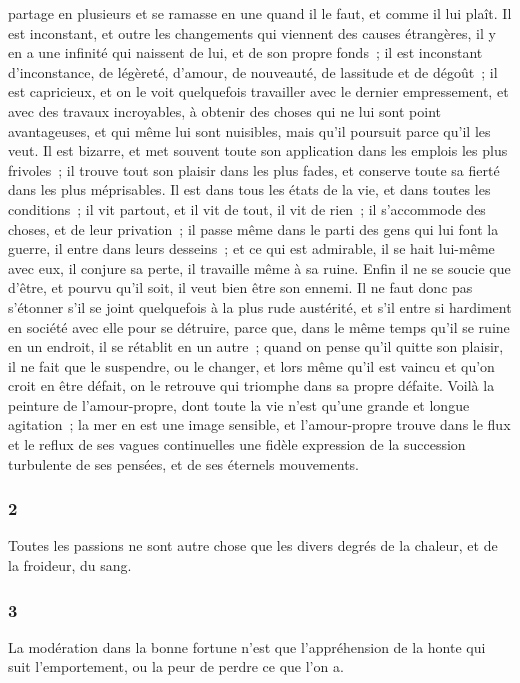 \documentclass[french,twoside]{book} %
\begin{document}
partage en plusieurs et se ramasse en une quand il le faut, et comme il lui plaît. Il est inconstant, et outre les changements qui viennent des causes étrangères, il y en a une infinité qui naissent de lui, et de son propre fonds ; il est inconstant d’inconstance, de légèreté, d’amour, de nouveauté, de lassitude et de dégoût ; il est capricieux, et on le voit quelquefois travailler avec le dernier empressement, et avec des travaux incroyables, à obtenir des choses qui ne lui sont point avantageuses, et qui même lui sont nuisibles, mais qu’il poursuit parce qu’il les veut. Il est bizarre, et met souvent toute son application dans les emplois les plus frivoles ; il trouve tout son plaisir dans les plus fades, et conserve toute sa fierté dans les plus méprisables. Il est dans tous les états de la vie, et dans toutes les conditions ; il vit partout, et il vit de tout, il vit de rien ; il s’accommode des choses, et de leur privation ; il passe même dans le parti des gens qui lui font la guerre, il entre dans leurs desseins ; et ce qui est admirable, il se hait lui-même avec eux, il conjure sa perte, il travaille même à sa ruine. Enfin il ne se soucie que d’être, et pourvu qu’il soit, il veut bien être son ennemi. Il ne faut donc pas s’étonner s’il se joint quelquefois à la plus rude austérité, et s’il entre si hardiment en société avec elle pour se détruire, parce que, dans le même temps qu’il se ruine en un endroit, il se rétablit en un autre ; quand on pense qu’il quitte son plaisir, il ne fait que le suspendre, ou le changer, et lors même qu’il est vaincu et qu’on croit en être défait, on le retrouve qui triomphe dans sa propre défaite. Voilà la peinture de l’amour-propre, dont toute la vie n’est qu’une grande et longue agitation ; la mer en est une image sensible, et l’amour-propre trouve dans le flux et le reflux de ses vagues continuelles une fidèle expression de la succession turbulente de ses pensées, et de ses éternels mouvements.
\subsubsection[{2}]{ \textsc{2} }
\noindent Toutes les passions ne sont autre chose que les divers degrés de la chaleur, et de la froideur, du sang.
\subsubsection[{3}]{ \textsc{3} }
\noindent La modération dans la bonne fortune n’est que l’appréhension de la honte qui suit l’emportement, ou la peur de perdre ce que l’on a.
\end{document}
